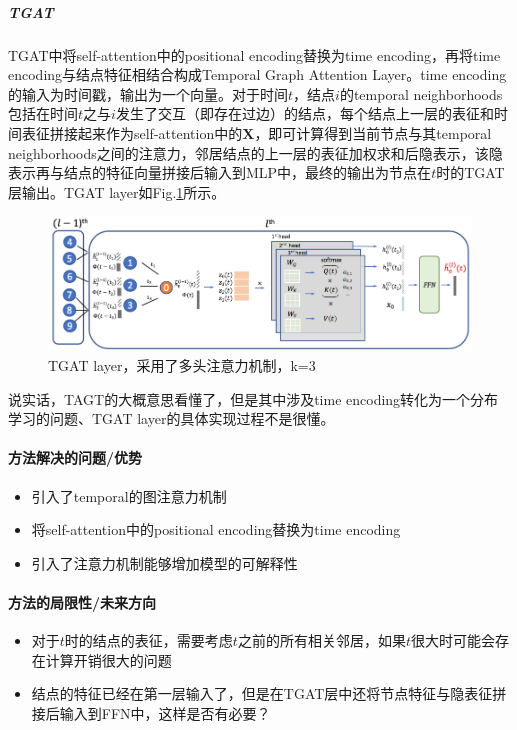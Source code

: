 \subparagraph{TGAT}
TGAT中将self-attention中的positional encoding替换为time encoding，再将time encoding与结点特征相结合构成Temporal Graph Attention Layer。time encoding的输入为时间戳，输出为一个向量。对于时间$t$，结点$i$的temporal neighborhoods包括在时间$t$之与$i$发生了交互（即存在过边）的结点，每个结点上一层的表征和时间表征拼接起来作为self-attention中的$\mathbf{X}$，即可计算得到当前节点与其temporal neighborhoods之间的注意力，邻居结点的上一层的表征加权求和后隐表示，该隐表示再与结点的特征向量拼接后输入到MLP中，最终的输出为节点在$t$时的TGAT层输出。TGAT layer如Fig.\ref{fig:tgat}所示。

\begin{figure}[h]
	\centering
	\includegraphics[width=.8\textwidth]{pics/TGAT.png}
	\caption{TGAT layer，采用了多头注意力机制，k=3}
	\label{fig:tgat}
\end{figure}

说实话，TAGT的大概意思看懂了，但是其中涉及time encoding转化为一个分布学习的问题、TGAT layer的具体实现过程不是很懂。






\paragraph{方法解决的问题/优势}

\begin{itemize}

	\item 引入了temporal的图注意力机制
	\item 将self-attention中的positional encoding替换为time encoding
	\item 引入了注意力机制能够增加模型的可解释性

\end{itemize}



\paragraph{方法的局限性/未来方向}

\begin{itemize}

	\item 对于$t$时的结点的表征，需要考虑$t$之前的所有相关邻居，如果$t$很大时可能会存在计算开销很大的问题
	\item 结点的特征已经在第一层输入了，但是在TGAT层中还将节点特征与隐表征拼接后输入到FFN中，这样是否有必要？

\end{itemize}



